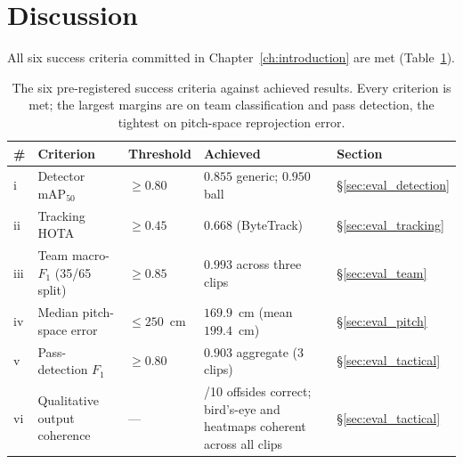 \section{Discussion}
\label{sec:eval_discussion}

All six success criteria committed in Chapter~\ref{ch:introduction}
are met (Table~\ref{tab:criteria_summary}).

\begin{table}[h]
\centering
\small
\renewcommand{\arraystretch}{1.15}
\begin{tabular}{
  >{\raggedright\arraybackslash}p{}
  >{\raggedright\arraybackslash}p{}
  >{\raggedright\arraybackslash}p{}
  >{\raggedright\arraybackslash}p{}
  >{\raggedright\arraybackslash}p{}
}
\toprule
\# & Criterion & Threshold & Achieved & Section \\
\midrule
i   & Detector $\mathrm{mAP}_{50}$ & $\geq 0.80$ & $0.855$ generic; $0.950$ ball
    & \S\ref{sec:eval_detection} \\
ii  & Tracking HOTA & $\geq 0.45$ & $0.668$ (ByteTrack)
    & \S\ref{sec:eval_tracking} \\
iii & Team macro-$F_1$ (35/65 split) & $\geq 0.85$ & $0.993$ across three clips
    & \S\ref{sec:eval_team} \\
iv  & Median pitch-space error & $\leq 250$~cm & $169.9$~cm (mean $199.4$~cm)
    & \S\ref{sec:eval_pitch} \\
v   & Pass-detection $F_1$ & $\geq 0.80$ & $0.903$ aggregate (3 clips)
    & \S\ref{sec:eval_tactical} \\
vi  & Qualitative output coherence & --- & 10/10 offsides correct;
    bird's-eye and heatmaps coherent across all clips
    & \S\ref{sec:eval_tactical} \\
\bottomrule
\end{tabular}
\caption[Summary of pre-registered success criteria against achieved
results.]{The six pre-registered success criteria against achieved
results. Every criterion is met; the largest margins are on team
classification and pass detection, the tightest on pitch-space
reprojection error.}
\label{tab:criteria_summary}
\end{table}

